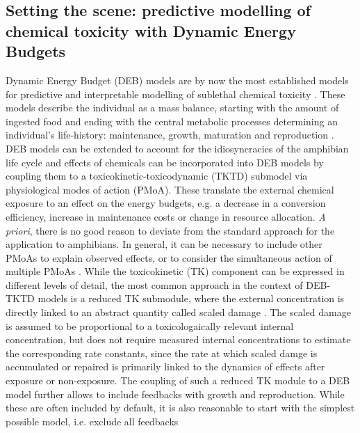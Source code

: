 \documentclass[utf8]{FrontiersinHarvard} %
\begin{document}
\subsection{Setting the scene: predictive modelling of chemical toxicity with Dynamic Energy Budgets}
%
Dynamic Energy Budget (DEB) models are by now the most established models 
for predictive and interpretable modelling of sublethal chemical toxicity 
\citep{jagerSimplifiedDynamicEnergy2012,martinExtrapolatingEcotoxicologicalEffects2013,sherborneModelingSublethalEffects2020,romoliEnvironmentalRiskAssessment2024}. 
These models describe the individual as a mass balance, 
starting with the amount of ingested food and ending with the central metabolic processes determining an 
individual's life-history:  
maintenance, growth, maturation and reproduction \citep{kooijmanDynamicEnergyBudget2010,jagerDEBkissQuestSimplest2013}.
DEB models can be extended to account for the idiosyncracies of the amphibian life cycle 
\citep{romoliDynamicEnergyBudget2025,hansulDynamicEnergyBudget2026} and
effects of chemicals can be incorporated into DEB models by coupling them to a toxicokinetic-toxicodynamic (TKTD) submodel 
via physiological modes of action (PMoA). 
These translate the external chemical exposure to an effect on the energy budgets, 
e.g. a decrease in a conversion efficiency, increase in maintenance costs or change in resource allocation.
\textit{A priori}, there is no good reason to deviate from the standard approach for the application to amphibians. 
In general, it can be necessary to include other PMoAs to explain observed effects, 
or to consider the simultaneous action of multiple PMoAs \citep{kochMakingSenseLifeHistory2021}.
While the toxicokinetic (TK) component can be expressed in different levels of detail, 
the most common approach in the context of DEB-TKTD models is a reduced TK submodule, where the external concentration is directly linked to an abstract quantity 
called scaled damage \citep{jagerRevisitingSimplifiedDEBtox2020}. 
The scaled damage is assumed to be proportional to a toxicologaically relevant internal concentration, 
but does not require measured internal concentrations to estimate the corresponding rate constants, 
since the rate at which scaled damge is accumulated or repaired is primarily linked to the dynamics of effects after exposure or non-exposure. 
The coupling of such a reduced TK module to a DEB model further allows to include feedbacks with growth and reproduction. 
While these are often included by default, it is also reasonable to start with the simplest possible model, i.e. exclude all feedbacks 
\end{document}

